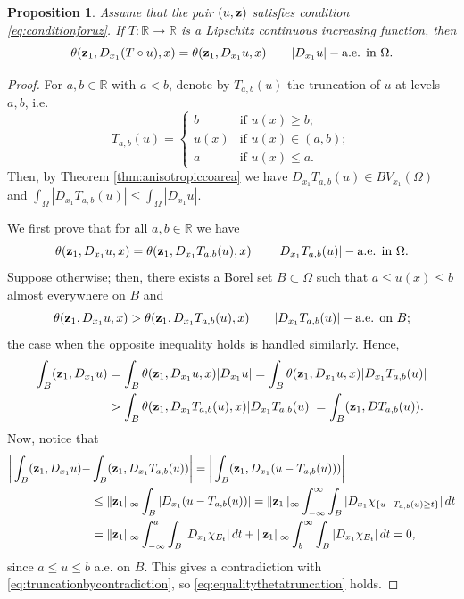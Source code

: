 \documentclass[reqno,12pt]{amsart}
\def\z{{\bf z}}
\newtheorem{proposition}[theorem]{Proposition}
\def\R{\mathbb R}
\numberwithin{equation}{section}
\newcommand{\threepartdef}[6]
{
	\left\{
	\begin{array}{lll}
		#1 & \mbox{if } #2 \\
		#3 & \mbox{if } #4 \\
		#5 & \mbox{if } #6
	\end{array}
	\right.
}
\begin{document}
\begin{proposition}\label{prop:lipschitzfunctionofdensity}
Assume that the pair $(u,\z)$ satisfies condition \eqref{eq:conditionforuz}. If $T: \mathbb{R} \rightarrow \mathbb{R}$ is a Lipschitz continuous increasing function, then
\begin{equation*}
\theta(\z_1, D_{x_1} (T \circ u),x) = \theta(\z_1, D_{x_1} u,x) \qquad |D_{x_1} u|-\mbox{\rm a.e. in } \Omega.
\end{equation*}
\end{proposition}


\begin{proof}
For $a,b \in \mathbb{R}$ with $a < b$, denote by $T_{a,b}(u)$ the truncation of $u$ at levels $a,b$, i.e.
\begin{equation*}
T_{a,b}(u) = \threepartdef{b}{u(x) \geq b;}{u(x)}{u(x) \in (a,b);}{a}{u(x) \leq a.}
\end{equation*}
Then, by Theorem \ref{thm:anisotropiccoarea} we have $D_{x_1} T_{a,b}(u) \in BV_{x_1}(\Omega)$ and $\int_{\Omega} |D_{x_1} T_{a,b}(u)| \leq \int_{\Omega} |D_{x_1} u|$. 

We first prove that for all $a,b \in \R$ we have
\begin{equation}\label{eq:equalitythetatruncation}
\theta(\z_1, D_{x_1} u,x) = \theta(\z_1, D_{x_1} T_{a,b}(u),x) \qquad |D_{x_1} T_{a,b}(u)|-\mbox{a.e. in } \Omega.
\end{equation}
Suppose otherwise; then, there exists a Borel set $B \subset \Omega$ such that $a \leq u(x) \leq b$ almost everywhere on $B$ and 
$$\theta(\z_1, D_{x_1} u,x) > \theta(\z_1, D_{x_1} T_{a,b}(u),x) \qquad |D_{x_1} T_{a,b}(u)|-\mbox{a.e. on } B;$$
the case when the opposite inequality holds is handled similarly. Hence,
\begin{align}\label{eq:truncationbycontradiction}
\int_B (\z_1, D_{x_1} u) &= \int_B \theta(\z_1, D_{x_1} u,x) |D_{x_1} u| = \int_B \theta(\z_1, D_{x_1} u,x) |D_{x_1} T_{a,b}(u)| \\
&> \int_B \theta(\z_1, D_{x_1} T_{a,b}(u),x) |D_{x_1} T_{a,b}(u)| = \int_B (\z_1, DT_{a,b}(u)).
\end{align}
Now, notice that
\begin{align}
\bigg| \int_B (\z_1, D_{x_1} u) - &\int_B (\z_1, D_{x_1} T_{a,b}(u)) \bigg| = \bigg| \int_B (\z_1, D_{x_1}(u - T_{a,b}(u))) \bigg| \\
&\leq \| \z_1 \|_\infty \int_B |D_{x_1}(u-T_{a,b}(u))| = \| \z_1 \|_{\infty} \int_{-\infty}^\infty \int_B |D_{x_1} \chi_{\{ u-T_{a,b}(u) \geq t \}}| \, dt \\
&= \| \z_1 \|_{\infty} \int_{-\infty}^a \int_B |D_{x_1} \chi_{E_t}| \, dt + \| \z_1 \|_{\infty} \int_{b}^\infty \int_B |D_{x_1} \chi_{E_t}| \, dt = 0,
\end{align}
since $a \leq u \leq b$ a.e. on $B$. This gives a contradiction with \eqref{eq:truncationbycontradiction}, so \eqref{eq:equalitythetatruncation} holds.


\end{proof}
\end{document}
